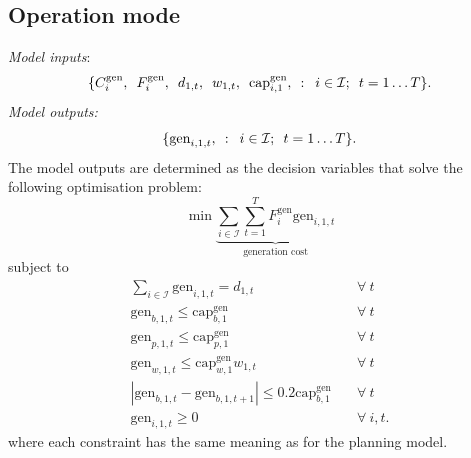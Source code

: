 \documentclass[preprint]{elsarticle}
\begin{document}
\subsection{Operation mode}
\label{sec:appendix:optimisation:model_2}
\noindent \textit{Model inputs}:
\begin{equation}
  \{C_{i}^\text{gen}, \hspace{0.5em} F_{i}^\text{gen}, \hspace{0.5em} d_{1, t}, \hspace{0.5em} w_{1, t}, \hspace{0.5em} \text{cap}_{i,1}^\text{gen}, \hspace{0.5em} : \hspace{0.5em} i \in \mathcal{I}; \hspace{0.5em} t = 1 \ldots T\}.
\label{eq:model_2:inputs}
\end{equation}
\textit{Model outputs:}
\begin{equation}
\{ \text{gen}_{i,1,t}, \hspace{0.5em} : \hspace{0.5em} i \in \mathcal{I}; \hspace{0.5em} t = 1 \ldots T\}.
\label{eq:model_2:decision_variables}
\end{equation}
The model outputs are determined as the decision variables that solve the following optimisation problem:
\begin{equation}
\min \underbrace{ \sum_{i \in \mathcal{I}} \sum_{t=1}^{T} F_i^\text{gen} \text{gen}_{i,1,t}}_\text{generation cost}
\label{eq:model_2:objective}
\end{equation}
\noindent subject to
\begin{align}
\sum_{i \in \mathcal{I}} \text{gen}_{i,1,t} = d_{1,t} \quad & \forall \: t \label{eq:model_2:demand_met} \\
\text{gen}_{b,1,t} \le \text{cap}_{b,1}^\text{gen} \quad & \forall \: t \label{eq:model_2:gen_le_cap_b} \\
\text{gen}_{p,1,t} \le \text{cap}_{p,1}^\text{gen} \quad & \forall \: t \label{eq:model_2:gen_le_cap_p} \\
\text{gen}_{w,1,t} \le \text{cap}_{w,1}^\text{gen} w_{1,t} \quad & \forall \: t \label{eq:model_2:gen_le_cap_w} \\
|\text{gen}_{b,1,t} - \text{gen}_{b,1,t+1}| \le 0.2 \text{cap}_{b,1}^\text{gen} \quad & \forall \: t \label{eq:model_2:ramping} \\
\text{gen}_{i,1,t} \ge 0 \quad & \forall \: i, t. \label{eq:model_2:ge_0}
\end{align}
\noindent where each constraint has the same meaning as for the planning model.
\end{document}
